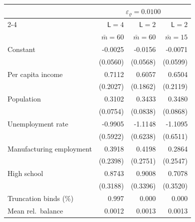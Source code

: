 \begin{tabular}{lrrr}
\toprule
 & \multicolumn{3}{c}{$\varepsilon_\varrho = 0.0100$} \\
\cmidrule(lr){2-4}
 & $\mathsf L = 4$ & $\mathsf L = 2$ & $\mathsf L = 2$ \\
 & $\bar m = 60$ & $\bar m = 60$ & $\bar m = 15$ \\
\midrule
Constant & -0.0025 & -0.0156 & -0.0071 \\
 & (0.0560) & (0.0568) & (0.0599) \\
Per capita income & 0.7112 & 0.6057 & 0.6504 \\
 & (0.2027) & (0.1862) & (0.2119) \\
Population & 0.3102 & 0.3433 & 0.3480 \\
 & (0.0754) & (0.0838) & (0.0868) \\
Unemployment rate & -0.9905 & -1.1148 & -1.1095 \\
 & (0.5922) & (0.6238) & (0.6511) \\
Manufacturing employment & 0.3918 & 0.4198 & 0.2864 \\
 & (0.2398) & (0.2751) & (0.2547) \\
High school & 0.8743 & 0.9008 & 0.7078 \\
 & (0.3188) & (0.3396) & (0.3520) \\
\midrule
Truncation binds (\%) & 0.997 & 0.000 & 0.000 \\
Mean rel.\ balance & 0.0012 & 0.0013 & 0.0013 \\
\bottomrule
\end{tabular}

